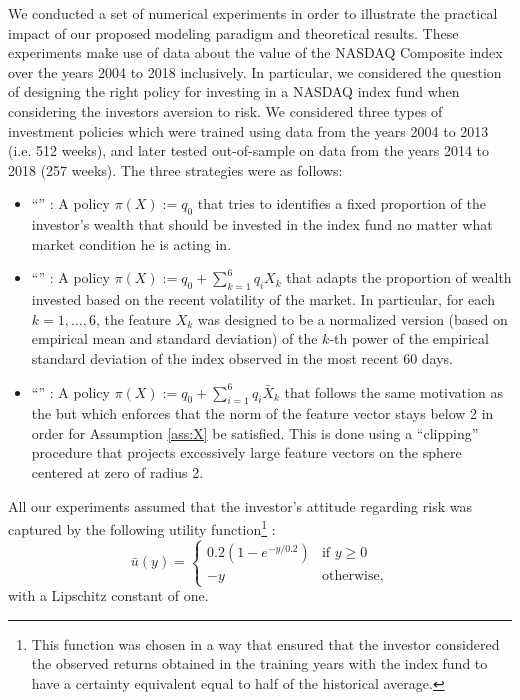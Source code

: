\documentclass[]{interact}
\theoremstyle{plain}%
\theoremstyle{definition}
\theoremstyle{remark}
\newcommand{\0}{\V{0}}
\newcommand{\1}{\V{1}}
\newcommand{\quoteIt}[1]{``#1''}
\theoremstyle{plain}
\theoremstyle{definition}
\begin{document}
We conducted a set of  numerical experiments in order to illustrate the practical impact of our proposed modeling paradigm and theoretical results. These experiments make use of data about the value of the NASDAQ Composite index %
over the years 2004 to 2018 inclusively. In particular, we considered the question of designing the right policy for investing in a NASDAQ index fund when considering the investors aversion to risk. We considered three types of investment policies which were trained using data from the years 2004 to 2013 (i.e. 512 weeks), and later tested out-of-sample on data from the years 2014 to 2018 (257 weeks). The three strategies were as follows:
\begin{itemize}
\item \quoteIt{\fixedP{}} : A policy $\pi(X):=q_0$ that tries to identifies a fixed proportion of the investor's wealth that should be invested in the index fund no matter what market condition he is acting in.
\item \quoteIt{\adaptPstd{}} : A policy $\pi(X):=q_0+ \sum_{k=1}^6 q_i X_k$ that adapts the proportion of wealth invested based on the recent volatility of the market. In particular, for each $k=1,\dots,6$, the feature $X_k$ was designed to be a normalized version (based on empirical mean and standard deviation) of the $k$-th power of the empirical standard deviation of the index observed in the most recent 60 days. 
\item \quoteIt{\adaptPclipped{}} : A policy $\pi(X):=q_0+ \sum_{i=1}^6 q_i \bar{X}_k$ that follows the same motivation as the \adaptPstd{} but which enforces that the norm of the feature vector stays below 2 in order for Assumption \ref{ass:X} be satisfied. This is done using a \quoteIt{clipping} procedure that projects excessively large feature vectors on the sphere centered at zero of radius 2. 
\end{itemize}
All our experiments assumed that the investor's attitude regarding risk was captured by the following utility function\footnote{This function was chosen in a way that ensured that the investor considered the observed returns obtained in the training years with the index fund to have a certainty equivalent equal to half of the historical average.} :
\[\bar{u}(y) = \left\{\begin{array}{cl}0.2(1-e^{-y/0.2})&\mbox{if $y\geq 0$}\\-y&\mbox{otherwise,}\end{array}\right.\]
with a Lipschitz constant of one.
\end{document}
